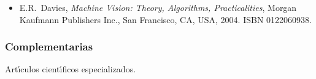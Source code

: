 \documentclass[10 pt]{article}
\begin{document}
 \begin{itemize}[itemsep=0em]

 \item{E.R.\ {\sc Davies}, {\em Machine Vision: Theory, Algorithms,
       Practicalities}, Morgan Kaufmann Publishers Inc., San
     Francisco, CA, USA, 2004. ISBN 0122060938.}
   
\end{itemize}

\subsubsection{Complementarias}

Art\'{\i}culos cient\'{\i}ficos especializados.

\label{final} %


\end{document}
